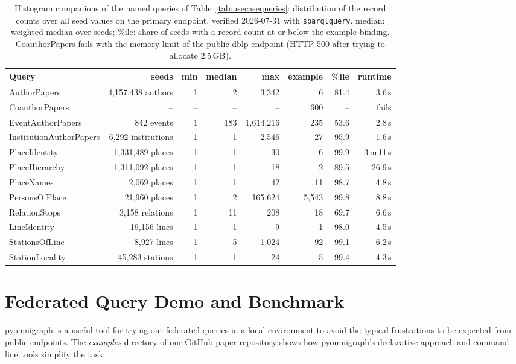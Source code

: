 \documentclass[
]{ceurart}
\begin{document}
\begin{table}
\caption{Histogram companions of the named queries of
Table~\ref{tab:usecasequeries}: distribution of the record counts over all
seed values on the primary endpoint, verified 2026-07-31 with
\texttt{sparqlquery}. median: weighted median over seeds; \%ile: share of
seeds with a record count at or below the example binding. CoauthorPapers
fails with the memory limit of the public dblp endpoint (HTTP 500 after
trying to allocate 2.5\,GB).}
\label{tab:histograms}
\begin{tabular}{lrrrrrrr}
\hline
Query & seeds & min & median & max & example & \%ile & runtime \\
\hline
AuthorPapers & 4,157,438 authors & 1 & 2 & 3,342 & 6 & 81.4 & 3.6\,s \\
CoauthorPapers & -- & -- & -- & -- & 600 & -- & fails \\
EventAuthorPapers & 842 events & 1 & 183 & 1,614,216 & 235 & 53.6 & 2.8\,s \\
InstitutionAuthorPapers & 6,292 institutions & 1 & 1 & 2,546 & 27 & 95.9 & 1.6\,s \\
PlaceIdentity & 1,331,489 places & 1 & 1 & 30 & 6 & 99.9 & 3\,m\,11\,s \\
PlaceHierarchy & 1,311,092 places & 1 & 1 & 18 & 2 & 89.5 & 26.9\,s \\
PlaceNames & 2,069 places & 1 & 1 & 42 & 11 & 98.7 & 4.8\,s \\
PersonsOfPlace & 21,960 places & 1 & 2 & 165,624 & 5,543 & 99.8 & 8.8\,s \\
RelationStops & 3,158 relations & 1 & 11 & 208 & 18 & 69.7 & 6.6\,s \\
LineIdentity & 19,156 lines & 1 & 1 & 9 & 1 & 98.0 & 4.5\,s \\
StationsOfLine & 8,927 lines & 1 & 5 & 1,024 & 92 & 99.1 & 6.2\,s \\
StationLocality & 45,283 stations & 1 & 1 & 24 & 5 & 99.4 & 4.3\,s \\
\hline
\end{tabular}
\end{table}


\section{Federated Query Demo and Benchmark}\label{sec:benchmark}
pyomnigraph is a useful tool for trying out federated queries in a local environment to avoid the typical frustrations to be expected from public endpoints. The \textit{examples} directory of our GitHub paper repository shows how pyomnigraph's declarative approach and command line tools simplify the task.
\end{document}
